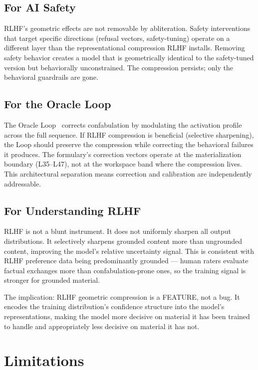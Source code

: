 \documentclass[11pt,a4paper]{article}
\begin{document}
\subsection{For AI Safety}

RLHF's geometric effects are not removable by abliteration. Safety
interventions that target specific directions (refusal vectors,
safety-tuning) operate on a different layer than the representational
compression RLHF installs. Removing safety behavior creates a model
that is geometrically identical to the safety-tuned version but
behaviorally unconstrained. The compression persists; only the
behavioral guardrails are gone.

\subsection{For the Oracle Loop}

The Oracle Loop~\citep{lyra2026oracle} corrects confabulation by
modulating the activation profile across the full sequence. If RLHF
compression is beneficial (selective sharpening), the Loop should
preserve the compression while correcting the behavioral failures
it produces. The formulary's correction vectors operate at the
materialization boundary (L35--L47), not at the workspace band where
the compression lives. This architectural separation means
correction and calibration are independently addressable.

\subsection{For Understanding RLHF}

RLHF is not a blunt instrument. It does not uniformly sharpen all
output distributions. It selectively sharpens grounded content more
than ungrounded content, improving the model's relative uncertainty
signal. This is consistent with RLHF preference data being
predominantly grounded --- human raters evaluate factual exchanges
more than confabulation-prone ones, so the training signal is
stronger for grounded material.

The implication: RLHF geometric compression is a FEATURE, not a
bug. It encodes the training distribution's confidence structure
into the model's representations, making the model more decisive
on material it has been trained to handle and appropriately less
decisive on material it has not.

\section{Limitations}
\label{sec:limitations}
\end{document}
